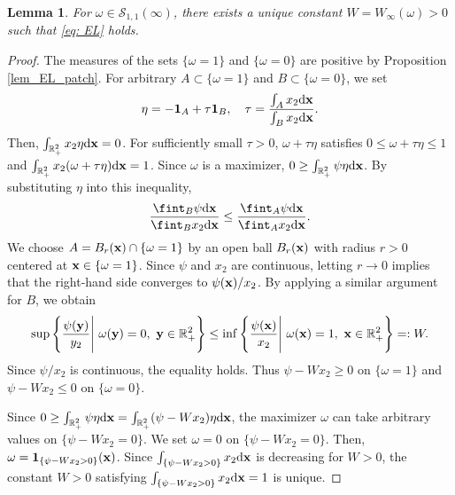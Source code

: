 \documentclass[11pt]{amsart}
\newtheorem{lemma}[theorem]{Lemma}
\theoremstyle{definition}
\theoremstyle{definition}
\numberwithin{equation}{section}
\newcommand{\0}{\emptyset}
\newcommand{\bfx}{{\bf x}}
\newcommand{\bfy}{{\bf y}}
\newcommand{\calS}{\mathcal S}
\newcommand{\dd}{\mathrm{d}}
\begin{document}
			
			
			\begin{lemma}
				\label{prop_representation_patch} 
				For $\omega \in \calS_{1,1}(\infty)$, 
				there exists a unique constant $W=W_{\infty}(\omega) > 0$ such that \eqref{eq: EL} holds.
			\end{lemma}
			
			
			\begin{proof}
				The measures of the sets $\{\omega=1\}$ and $\{\omega=0\}$ are positive by Proposition \ref{lem_EL_patch}. For arbitrary $A\subset \{\omega=1\}$ and $B\subset \{\omega=0\}$, we set 
				\begin{align*}
					\eta=-\mathbf{1}_{A}+\tau \mathbf{1}_{B},\quad \tau=\frac{\int_{A}x_2 \dd\bfx}{\int_{B}x_2 \dd\bfx}.
				\end{align*}
				Then, $\int_{\mathbb{R}^{2}_{+}}x_2 \eta \dd\bfx=0$. For sufficiently small $\tau>0$, $\omega+\tau \eta$ satisfies $0\leq \omega+\tau \eta\leq 1$ and $\int_{\mathbb{R}^{2}_{+}}x_2 (\omega+\tau \eta)\dd\bfx=1$. Since $\omega$ is a maximizer, $0\geq \int_{\mathbb{R}^{2}_{+}}\psi \eta \dd\bfx$. By substituting $\eta$ into this inequality, 
				\begin{align*}
					\frac{\fint_{B}\psi  \dd\bfx}{\fint_{B}x_2 \dd\bfx}\leq \frac{\fint_{A}\psi  \dd\bfx}{\fint_{A}x_2 \dd\bfx}.
				\end{align*}
				We choose $A=B_r(\bfx)\cap \{\omega=1\}$ by an open ball $B_r(\bfx)$ with radius $r>0$ centered at $\bfx\in \{\omega=1\}$. Since $\psi$ and $x_2$ are continuous, letting $r\to 0$ implies that the right-hand side converges to $\psi(\bfx)/x_2$. By applying a similar argument for $B$, we obtain 
				\begin{align*}
					\sup\left\{\frac{\psi (\bfy)}{y_2}\Bigg|\ \omega(\bfy)=0,\ \bfy\in \mathbb{R}^{2}_{+} \right\}
					\leq \inf\left\{\frac{\psi (\bfx)}{x_2}\Bigg|\ \omega(\bfx)=1,\ \bfx\in \mathbb{R}^{2}_{+} \right\}=:W.
				\end{align*}
				Since $\psi/x_2$ is continuous, the equality holds. Thus $\psi-Wx_2\geq 0$ on $\{\omega=1\}$ and $\psi-Wx_2\leq 0$ on $\{\omega=0\}$.
				
				Since $0\geq \int_{\mathbb{R}^{2}_{+}}\psi \eta \dd\bfx=\int_{\mathbb{R}^{2}_{+}}(\psi-Wx_2) \eta \dd\bfx$, the maximizer $\omega$ can take arbitrary values on $\{\psi-Wx_2=0\}$. We set $\omega=0$ on $\{\psi-Wx_2=0\}$. Then, $\omega=\mathbf{1}_{\{\psi-Wx_2>0\}}(\bfx)$. Since $\int_{\{\psi-Wx_2>0\}}x_2\dd\bfx$ is decreasing for $W>0$, the constant $W>0$ satisfying $\int_{\{\psi-Wx_2>0\}}x_2\dd\bfx=1$ is unique.
			\end{proof}
			
\end{document}
